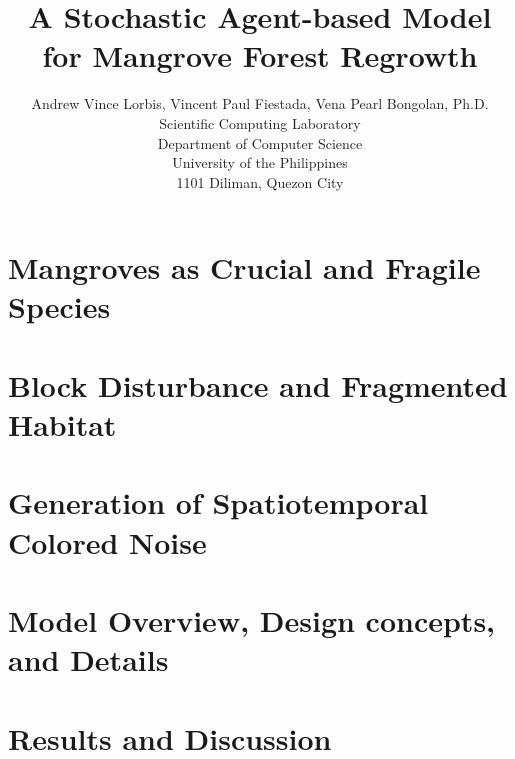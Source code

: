 \documentclass[a4paper]{scl-article}
\begin{document}
\title{A Stochastic Agent-based Model for Mangrove Forest Regrowth}

\author{Andrew Vince Lorbis, Vincent Paul Fiestada, Vena Pearl Bongolan, Ph.D.\\
Scientific Computing Laboratory\\
Department of Computer Science\\
University of the Philippines\\
1101 Diliman, Quezon City
}

\maketitle

\begin{abstract}
    
\end{abstract}


\section{Mangroves as Crucial and Fragile Species}

\section{Block Disturbance and Fragmented Habitat}

\section{Generation of Spatiotemporal Colored Noise}

\section{Model Overview, Design concepts, and Details}

\section{Results and Discussion}


\label{sect:bib}


\end{document}
